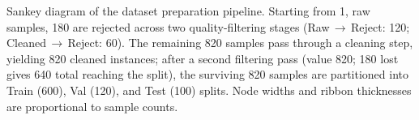 \caption{Sankey diagram of the dataset preparation pipeline. Starting from 1, raw samples, 180 are rejected across two quality-filtering stages (Raw\,$\to$\,Reject: 120; Cleaned\,$\to$\,Reject: 60). The remaining 820 samples pass through a cleaning step, yielding 820 cleaned instances; after a second filtering pass (value 820; 180 lost gives 640 total reaching the split), the surviving 820 samples are partitioned into Train (600), Val (120), and Test (100) splits. Node widths and ribbon thicknesses are proportional to sample counts.}
